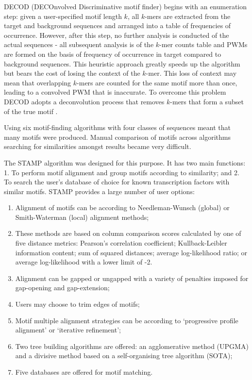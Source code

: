 \documentclass[12pt]{article}
\begin{document}
DECOD (DECOnvolved Discriminative motif finder) \citep{huggins2011decod} begins with an enumeration step: given a user-specified motif length $k$, all $k$-mers are extracted from the target and background sequences and arranged into a table of frequencies of occurrence. However, after this step, no further analysis is conducted of the actual sequences - all subsequent analysis is of the $k$-mer counts table and PWMs are formed on the basis of frequency of occurrence in target compared to background sequences. This heuristic approach greatly speeds up the algorithm but bears the cost of losing the context of the $k$-mer. This loss of context may mean that overlapping $k$-mers are counted for the same motif more than once, leading to a convolved PWM that is inaccurate. To overcome this problem DECOD adopts a deconvolution process that removes $k$-mers that form a subset of the true motif  \citep{huggins2011decod}.

Using six motif-finding algorithms with four classes of sequences meant that many motifs were produced. Manual comparison of motifs across algorithms searching for similarities amongst results became very difficult. 

The STAMP algorithm \citep{mahony2007stamp} was designed for this purpose. It has two main functions:
1. To perform motif alignment and group motifs according to similarity; and
2. To search the user's database of choice for known transcription factors with similar motifs.  STAMP provides a large number of user options:

\begin{enumerate}
\item Alignment of motifs can be according to Needleman-Wunsch (global) or Smith-Waterman (local) alignment methods;
\item These methods are based on column comparison scores calculated by one of five distance metrics: Pearson's correlation coefficient; Kullback-Leibler information content; sum of squared distances; average log-likelihood ratio; or average log-likelihood with a lower limit of -2.
\item Alignment can be gapped or ungapped with a variety of penalties imposed for gap-opening and gap-extension;
\item Users may choose to trim edges of motifs;
\item Motif multiple alignment strategies can be according to `progressive profile alignment' or `iterative refinement';
\item  Two tree building algorithms are offered: an agglomerative method (UPGMA) and a divisive method based on a self-organising tree algorithm (SOTA);
\item Five databases are offered for motif matching.
\end{enumerate}
\end{document}
